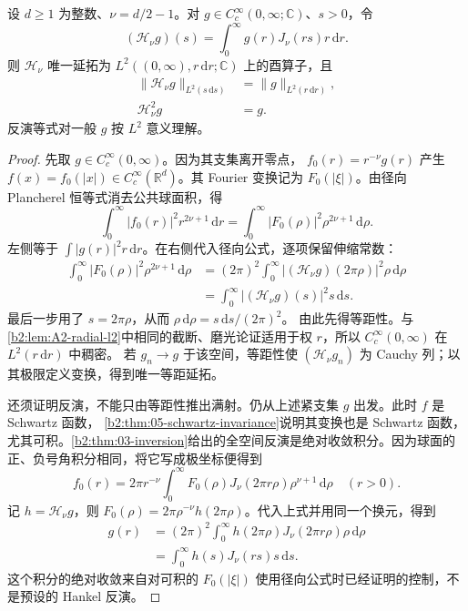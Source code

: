 \begin{theorem}
\label{b2:thm:A2-hankel}
设 \(d\ge1\) 为整数、\(\nu=d/2-1\)。对
\(g\in C_c^\infty(0,\infty;\mathbb C)\)、\(s>0\)，令
\[
 (\mathcal H_\nu g)(s)=\int_0^\infty g(r)J_\nu(rs)r\,\mathrm dr.
\]
则 \(\mathcal H_\nu\) 唯一延拓为
\(L^2((0,\infty),r\,\mathrm dr;\mathbb C)\) 上的酉算子，且
\[
\begin{aligned}
 \|\mathcal H_\nu g\|_{L^2(s\,\mathrm ds)}
 &=\|g\|_{L^2(r\,\mathrm dr)},\\
 \mathcal H_\nu^2g&=g.
\end{aligned}
\]
反演等式对一般 \(g\) 按 \(L^2\) 意义理解。
\end{theorem}
\begin{proof}
先取 \(g\in C_c^\infty(0,\infty)\)。因为其支集离开零点，
\(f_0(r)=r^{-\nu}g(r)\) 产生
\(f(x)=f_0(|x|)\in C_c^\infty(\mathbb R^d)\)。其 Fourier 变换记为
\(F_0(|\xi|)\)。由径向 Plancherel 恒等式消去公共球面积，得
\[
 \int_0^\infty|f_0(r)|^2r^{2\nu+1}\,\mathrm dr
 =\int_0^\infty|F_0(\rho)|^2\rho^{2\nu+1}\,\mathrm d\rho.
\]
左侧等于 \(\int|g(r)|^2r\,\mathrm dr\)。在右侧代入径向公式，逐项保留伸缩常数：
\[
\begin{aligned}
 \int_0^\infty|F_0(\rho)|^2\rho^{2\nu+1}\,\mathrm d\rho
 &=(2\pi)^2\int_0^\infty
       |(\mathcal H_\nu g)(2\pi\rho)|^2\rho\,\mathrm d\rho\\
 &=\int_0^\infty|(\mathcal H_\nu g)(s)|^2s\,\mathrm ds.
\end{aligned}
\]
最后一步用了 \(s=2\pi\rho\)，从而
\(\rho\,\mathrm d\rho=s\,\mathrm ds/(2\pi)^2\)。
由此先得等距性。与\cref{b2:lem:A2-radial-l2}中相同的截断、磨光论证适用于权 \(r\)，所以
\(C_c^\infty(0,\infty)\) 在 \(L^2(r\,\mathrm dr)\) 中稠密。
若 \(g_n\to g\) 于该空间，等距性使
\((\mathcal H_\nu g_n)\) 为 Cauchy 列；以其极限定义变换，得到唯一等距延拓。

还须证明反演，不能只由等距性推出满射。仍从上述紧支集 \(g\) 出发。此时 \(f\) 是 Schwartz 函数，
\cref{b2:thm:05-schwartz-invariance}说明其变换也是 Schwartz 函数，尤其可积。\cref{b2:thm:03-inversion}给出的全空间反演是绝对收敛积分。因为球面的正、负号角积分相同，将它写成极坐标便得到
\[
 f_0(r)=2\pi r^{-\nu}\int_0^\infty
       F_0(\rho)J_\nu(2\pi r\rho)\rho^{\nu+1}\,\mathrm d\rho
 \quad(r>0).
\]
记 \(h=\mathcal H_\nu g\)，则
\(F_0(\rho)=2\pi\rho^{-\nu}h(2\pi\rho)\)。代入上式并用同一个换元，得到
\[
\begin{aligned}
 g(r)
 &=(2\pi)^2\int_0^\infty
      h(2\pi\rho)J_\nu(2\pi r\rho)\rho\,\mathrm d\rho\\
 &=\int_0^\infty h(s)J_\nu(rs)s\,\mathrm ds.
\end{aligned}
\]
这个积分的绝对收敛来自对可积的 \(F_0(|\xi|)\) 使用径向公式时已经证明的控制，不是预设的 Hankel 反演。


\end{proof}
